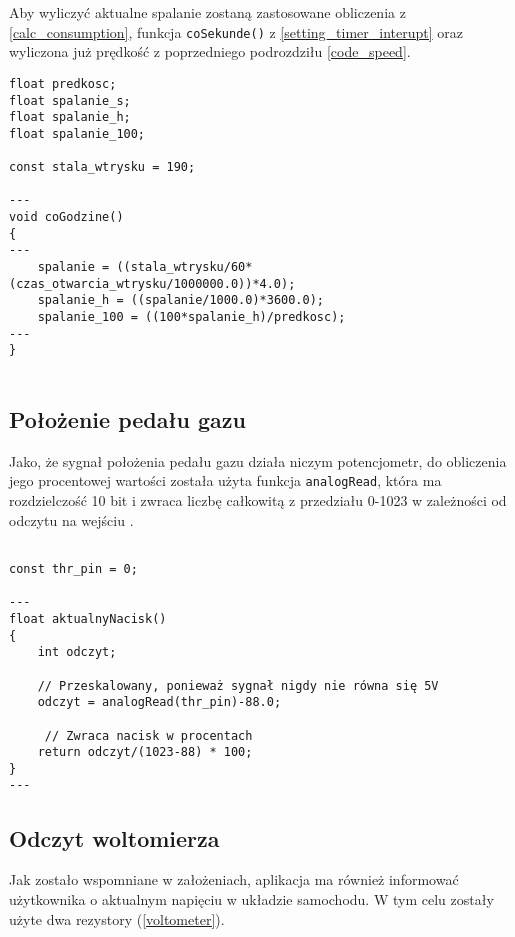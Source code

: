 Aby wyliczyć aktualne spalanie zostaną zastosowane obliczenia z \ref{calc_consumption}, funkcja \texttt{coSekunde()} z \ref{setting_timer_interupt} oraz wyliczona już prędkość z poprzedniego podrozdziłu \ref{code_speed}.

\begin{lstlisting}[label=list:vss_int,caption=Obliczanie aktualnego spalania,
basicstyle=\footnotesize\ttfamily]
float predkosc;
float spalanie_s;
float spalanie_h;
float spalanie_100;

const stala_wtrysku = 190;

---
void coGodzine()
{
---
    spalanie = ((stala_wtrysku/60*(czas_otwarcia_wtrysku/1000000.0))*4.0);
    spalanie_h = ((spalanie/1000.0)*3600.0);
    spalanie_100 = ((100*spalanie_h)/predkosc);
---
}


\end{lstlisting}


\subsection{Położenie pedału gazu}

Jako, że sygnał położenia pedału gazu działa niczym potencjometr, do obliczenia jego procentowej wartości została użyta funkcja \texttt{analogRead}, która ma rozdzielczość 10 bit i zwraca liczbę całkowitą z przedziału 0-1023 w zależności od odczytu na wejściu \cite{ard_ref}.

\begin{lstlisting}[label=list:code_thr,caption=Obliczanie procentowego nacisku na pedał gazu,
basicstyle=\footnotesize\ttfamily]

const thr_pin = 0;

---
float aktualnyNacisk()
{
    int odczyt;
    
    // Przeskalowany, ponieważ sygnał nigdy nie równa się 5V
    odczyt = analogRead(thr_pin)-88.0; 
    
     // Zwraca nacisk w procentach
    return odczyt/(1023-88) * 100;
}
---
\end{lstlisting}


\subsection{Odczyt woltomierza}

Jak zostało wspomniane w założeniach, aplikacja ma również informować użytkownika o aktualnym napięciu w układzie samochodu. W tym celu zostały użyte dwa rezystory (\ref{voltometer}).

